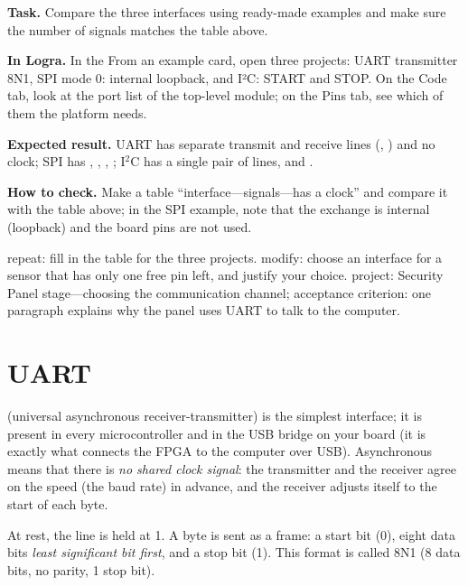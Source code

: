\begin{diybox}
\textbf{Task.} Compare the three interfaces using ready-made examples and make sure the number of signals matches the table above.

\textbf{In Logra.} In the From an example card, open three projects: UART transmitter 8N1, SPI mode 0: internal loopback, and I²C: START and STOP. On the Code tab, look at the port list of the top-level module; on the Pins tab, see which of them the platform needs.

\textbf{Expected result.} UART has separate transmit and receive lines (, ) and no clock; SPI has , , , ; I$^2$C has a single pair of lines,  and .

\textbf{How to check.} Make a table ``interface---signals---has a clock'' and compare it with the table above; in the SPI example, note that the exchange is internal (loopback) and the board pins are not used.

 repeat: fill in the table for the three projects.  modify: choose an interface for a sensor that has only one free pin left, and justify your choice.  project: Security Panel stage---choosing the communication channel; acceptance criterion: one paragraph explains why the panel uses UART to talk to the computer.
\end{diybox}

\section{UART}

 (universal asynchronous receiver-transmitter) is the simplest
interface; it is present in every microcontroller and in the USB bridge on your
board (it is exactly what connects the FPGA to the computer over USB).
Asynchronous means that there is \emph{no shared clock signal}: the transmitter
and the receiver agree on the speed (the baud rate) in advance, and the
receiver adjusts itself to the start of each byte.

At rest, the line is held at 1. A byte is sent as a frame: a start bit (0),
eight data bits \emph{least significant bit first}, and a stop bit (1). This
format is called 8N1 (8 data bits, no parity, 1 stop bit).

